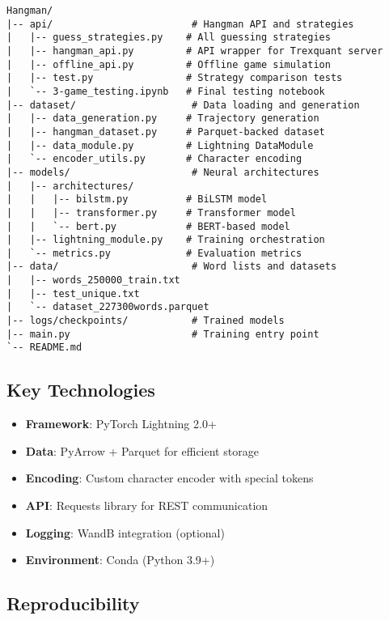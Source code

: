 \documentclass[12pt,a4paper]{article}
\begin{document}
\begin{verbatim}
Hangman/
|-- api/                        # Hangman API and strategies
|   |-- guess_strategies.py    # All guessing strategies
|   |-- hangman_api.py         # API wrapper for Trexquant server
|   |-- offline_api.py         # Offline game simulation
|   |-- test.py                # Strategy comparison tests
|   `-- 3-game_testing.ipynb   # Final testing notebook
|-- dataset/                    # Data loading and generation
|   |-- data_generation.py     # Trajectory generation
|   |-- hangman_dataset.py     # Parquet-backed dataset
|   |-- data_module.py         # Lightning DataModule
|   `-- encoder_utils.py       # Character encoding
|-- models/                     # Neural architectures
|   |-- architectures/
|   |   |-- bilstm.py          # BiLSTM model
|   |   |-- transformer.py     # Transformer model
|   |   `-- bert.py            # BERT-based model
|   |-- lightning_module.py    # Training orchestration
|   `-- metrics.py             # Evaluation metrics
|-- data/                       # Word lists and datasets
|   |-- words_250000_train.txt
|   |-- test_unique.txt
|   `-- dataset_227300words.parquet
|-- logs/checkpoints/           # Trained models
|-- main.py                     # Training entry point
`-- README.md
\end{verbatim}

\subsection{Key Technologies}

\begin{itemize}
    \item \textbf{Framework}: PyTorch Lightning 2.0+
    \item \textbf{Data}: PyArrow + Parquet for efficient storage
    \item \textbf{Encoding}: Custom character encoder with special tokens
    \item \textbf{API}: Requests library for REST communication
    \item \textbf{Logging}: WandB integration (optional)
    \item \textbf{Environment}: Conda (Python 3.9+)
\end{itemize}

\subsection{Reproducibility}
\end{document}
